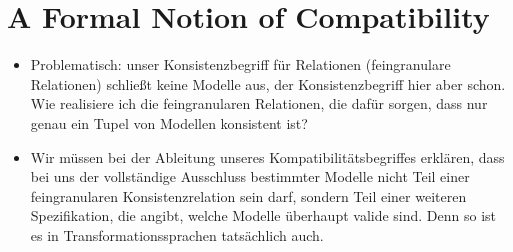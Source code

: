 \section{A Formal Notion of Compatibility}


\begin{itemize}
    \item Problematisch: unser Konsistenzbegriff für Relationen (feingranulare Relationen) schließt keine Modelle aus, der Konsistenzbegriff hier aber schon. Wie realisiere ich die feingranularen Relationen, die dafür sorgen, dass nur genau ein Tupel von Modellen konsistent ist?
    \item Wir müssen bei der Ableitung unseres Kompatibilitätsbegriffes erklären, dass bei uns der vollständige Ausschluss bestimmter Modelle nicht Teil einer feingranularen Konsistenzrelation sein darf, sondern Teil einer weiteren Spezifikation, die angibt, welche Modelle überhaupt valide sind. Denn so ist es in Transformationssprachen tatsächlich auch.
\end{itemize}



